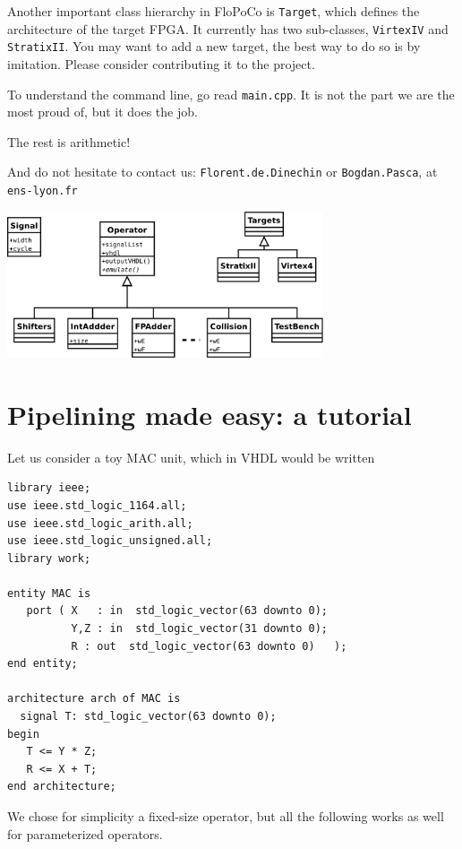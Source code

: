 \documentclass{article}
\begin{document}
Another important class hierarchy in FloPoCo is \texttt{Target}, which
defines the architecture of the target FPGA. It currently has two
sub-classes, \texttt{VirtexIV} and \texttt{StratixII}. You may want to
add a new target, the best way to do so is by imitation. Please
consider contributing it to the project.

To understand the command line, go read \texttt{main.cpp}. It is not
the part we are the most proud of, but it does the job.

The rest is arithmetic!

And do not hesitate to contact us: \texttt{Florent.de.Dinechin} or
\texttt{Bogdan.Pasca}, at \texttt{ens-lyon.fr}

\begin{center}
  \begin{latexonly}
  \includegraphics[width=0.7\textwidth]{../Figures/FloPoCoClasses.pdf}        
  \end{latexonly}
\end{center}


\section{Pipelining made easy: a tutorial}
\label{sec:pme}

Let us consider a toy MAC unit, which in VHDL would be written
\begin{verbatim}
library ieee;
use ieee.std_logic_1164.all;
use ieee.std_logic_arith.all;
use ieee.std_logic_unsigned.all;
library work;

entity MAC is
   port ( X   : in  std_logic_vector(63 downto 0);
          Y,Z : in  std_logic_vector(31 downto 0);
          R : out  std_logic_vector(63 downto 0)   );
end entity;

architecture arch of MAC is
  signal T: std_logic_vector(63 downto 0);
begin
   T <= Y * Z;
   R <= X + T;
end architecture;
\end{verbatim}
We chose for simplicity a fixed-size operator, but all the following
works as well for parameterized operators.
\end{document}
